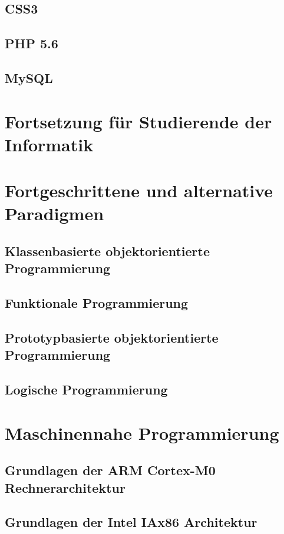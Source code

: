 \documentclass[11pt, a4paper, oneside, draft]{book}
\begin{document}
\chapter{CSS3}
%
\chapter{PHP 5.6}
%
\chapter{MySQL}

\part{Fortsetzung für Studierende der Informatik}


\part{Fortgeschrittene und alternative Paradigmen}

\chapter{Klassenbasierte objektorientierte Programmierung}
%

%

\chapter{Funktionale Programmierung}

\chapter{Prototypbasierte objektorientierte Programmierung}
%

\chapter{Logische Programmierung}

\part{Maschinennahe Programmierung}
%
\chapter{Grundlagen der ARM Cortex-M0 Rechnerarchitektur}

\chapter{Grundlagen der Intel IAx86 Architektur}

\renewcommand{\indexname}{Stichwortverzeichnis}		%
\printindex
\end{document}
